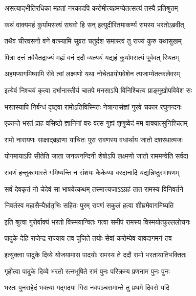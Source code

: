 \twolineshloka
{असत्याद्भीतिरधिका महतां नरकादपि}
{करोमीत्यहमप्येतत्सत्यं तस्यै प्रतिश्रुतम्} %

\twolineshloka
{कथं वाक्यमहं कुर्यामसत्यं राघवो हि सन्}
{इत्युदीरितमाकर्ण्य रामस्य भरतोऽब्रवीत्} %


\twolineshloka
{तथैव चीरवसनो वने वत्स्यामि सुव्रत}
{चतुर्दश समास्त्वं तु राज्यं कुरु यथासुखम्} %


\twolineshloka
{पित्रा दत्तं तवैवैतद्राज्यं मह्यं वनं ददौ}
{व्यत्ययं यद्यहं कुर्यामसत्यं पूर्ववत् स्थितम्} %

\twolineshloka
{अहमप्यागमिष्यामि सेवे त्वां लक्ष्मणो यथा}
{नोचेत्प्रायोपवेशेन त्यजाम्येतत्कलेवरम्} %

\twolineshloka
{इत्येवं निश्चयं कृत्वा दर्भानास्तीर्य चातपे}
{मनसाऽपि विनिश्चित्य प्राङ्मुखोपविवेश सः} %

\twolineshloka
{भरतस्यापि निर्बन्धं दृष्ट्वा रामोऽतिविस्मितः}
{नेत्रान्तसंज्ञां गुरवे चकार रघुनन्दनः} %

\twolineshloka
{एकान्ते भरतं प्राह वसिष्ठो ज्ञानिनां वरः}
{वत्स गुह्यं शृणुष्वेदं मम वाक्यात्सुनिश्चितम्} %

\twolineshloka
{रामो नारायणः साक्षाद्ब्रह्मणा याचितः पुरा}
{रावणस्य वधार्थाय जातो दशरथात्मजः} %

\twolineshloka
{योगमायाऽपि सीतेति जाता जनकनन्दिनी}
{शेषोऽपि लक्ष्मणो जातो राममन्वेति सर्वदा} %

\twolineshloka
{रावणं हन्तुकामास्ते गमिष्यन्ति न संशयः}
{कैकेय्या वरदानादि यद्यन्निष्ठुरभाषणम्} %

\twolineshloka
{सर्वं देवकृतं नो चेदेवं सा भाषयेत्कथम्}
{तस्मात्त्यजाऽऽग्रहं तात रामस्य विनिवर्तने} %

\twolineshloka
{निवर्तस्व महासैन्यैर्भ्रातृभिः सहितः पुरम्}
{रावणं सकुलं हत्वा शीघ्रमेवागमिष्यति} %

\twolineshloka
{इति श्रुत्वा गुरोर्वाक्यं भरतो विस्मयान्वितः}
{गत्वा समीपं रामस्य विस्मयोत्फुल्ललोचनः} %

\twolineshloka
{पादुके देहि राजेन्द्र राज्याय तव पूजिते}
{तयोः सेवां करोम्येव यावदागमनं तव} %

\twolineshloka
{इत्युक्त्वा पादुके दिव्ये योजयामास पादयोः}
{रामस्य ते ददौ रामो भरतायातिभक्तितः} %

\twolineshloka
{गृहीत्वा पादुके दिव्ये भरतो रत्नभूषिते}
{रामं पुनः परिक्रम्य प्रणनाम पुनः पुनः} %

\twolineshloka
{भरतः पुनराहेदं भक्त्या गद्गदया गिरा}
{नवपञ्चसमान्ते तु प्रथमे दिवसे यदि} %

